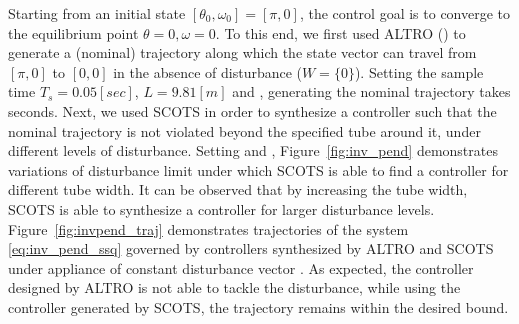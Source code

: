 Starting from an initial state $[\theta_0,\omega_0]=[\pi,0]$, the control goal is to converge to the equilibrium point 
$\theta=0, \omega=0$. To this end, we first used ALTRO () to generate a (nominal) trajectory along which the state vector can travel from $[\pi,0]$ to $[0,0]$ in the absence of disturbance ($W=\{0\}$). Setting the sample time $T_s=0.05[sec]$, $L=9.81[m]$ and , generating the nominal trajectory takes  seconds. Next, we used SCOTS in order to synthesize a controller such that the nominal trajectory is not violated beyond the specified tube around it, under different levels of disturbance. Setting  and , Figure~\ref{fig:inv_pend} demonstrates variations of disturbance limit under which SCOTS is able to find a controller for different tube width. It can be observed that by increasing the tube width, SCOTS is able to synthesize a controller for larger disturbance levels. Figure~\ref{fig:invpend_traj} demonstrates trajectories of the system  \eqref{eq:inv_pend_ssq} governed by controllers synthesized by ALTRO and SCOTS under appliance of constant disturbance vector . As expected, the controller designed by ALTRO is not able to tackle the disturbance, while using the controller generated by SCOTS, the trajectory remains within the desired bound.
